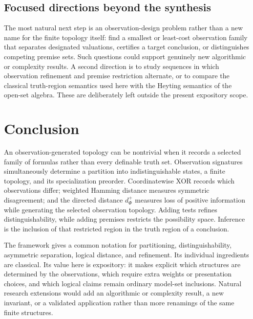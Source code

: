 \documentclass[11pt]{article}
\theoremstyle{definition}
\theoremstyle{plain}
\theoremstyle{remark}
\begin{document}
\subsection{Focused directions beyond the synthesis}

The most natural next step is an observation-design problem rather than a new
name for the finite topology itself: find a smallest or least-cost observation
family that separates designated valuations, certifies a target conclusion, or
distinguishes competing premise sets.  Such questions could support genuinely
new algorithmic or complexity results.  A second direction is to study
sequences in which observation refinement and premise restriction alternate,
or to compare the classical truth-region semantics used here with the Heyting
semantics of the open-set algebra.  These are deliberately left outside the
present expository scope.

\section{Conclusion}

An observation-generated topology can be nontrivial when it records a selected
family of formulas rather than every definable truth set.  Observation
signatures simultaneously determine a partition into indistinguishable states,
a finite topology, and its specialization preorder.  Coordinatewise XOR records
which observations differ; weighted Hamming distance measures symmetric
disagreement; and the directed distance $d_\Phi^+$ measures loss of positive
information while generating the selected observation topology.  Adding tests
refines distinguishability, while adding premises restricts the possibility
space.  Inference is the inclusion of that restricted region in the truth
region of a conclusion.

The framework gives a common notation for partitioning, distinguishability,
asymmetric separation, logical distance, and refinement.  Its individual
ingredients are classical.  Its value here is expository: it makes explicit
which structures are determined by the observations, which require extra
weights or presentation choices, and which logical claims remain ordinary
model-set inclusions.  Natural research extensions would add an algorithmic or
complexity result, a new invariant, or a validated application rather than more
renamings of the same finite structures.
\end{document}
